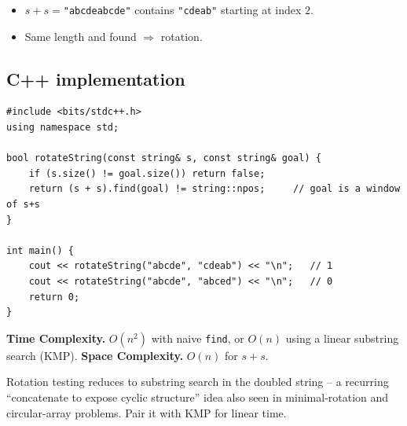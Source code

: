 \begin{itemize}
  \item $s+s=$\texttt{"abcdeabcde"} contains \texttt{"cdeab"} starting at
        index $2$.
  \item Same length and found $\Rightarrow$ rotation.
\end{itemize}

\subsection*{C++ implementation}

\begin{lstlisting}
#include <bits/stdc++.h>
using namespace std;

bool rotateString(const string& s, const string& goal) {
    if (s.size() != goal.size()) return false;
    return (s + s).find(goal) != string::npos;     // goal is a window of s+s
}

int main() {
    cout << rotateString("abcde", "cdeab") << "\n";   // 1
    cout << rotateString("abcde", "abced") << "\n";   // 0
    return 0;
}
\end{lstlisting}

\begin{complexitybox}
\textbf{Time Complexity.} $O(n^2)$ with naive \texttt{find}, or $O(n)$ using
a linear substring search (KMP). \textbf{Space Complexity.} $O(n)$ for
$s+s$.
\end{complexitybox}

\begin{takeawaybox}
Rotation testing reduces to substring search in the doubled string -- a
recurring ``concatenate to expose cyclic structure'' idea also seen in
minimal-rotation and circular-array problems. Pair it with KMP for linear
time.
\end{takeawaybox}
